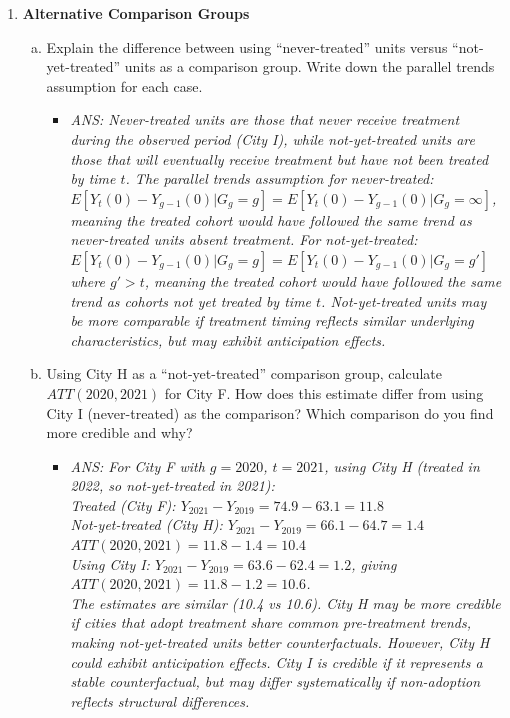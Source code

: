 \documentclass[12pt,a4paper]{article}
\newcommand{\ans}[1]{\begin{itemize}\item[$\bullet$] \textit{ANS: #1}\end{itemize}}
\begin{document}
\begin{enumerate}
\item \textbf{Alternative Comparison Groups}
\begin{enumerate}[(a)]
\item Explain the difference between using ``never-treated'' units versus ``not-yet-treated'' units as a comparison group. Write down the parallel trends assumption for each case.
\ans{Never-treated units are those that never receive treatment during the observed period (City I), while not-yet-treated units are those that will eventually receive treatment but have not been treated by time $t$. The parallel trends assumption for never-treated: $E[Y_t(0) - Y_{g-1}(0)|G_g = g] = E[Y_t(0)-Y_{g-1}(0)|G_g = \infty]$, meaning the treated cohort would have followed the same trend as never-treated units absent treatment. For not-yet-treated: $E[Y_t(0) - Y_{g-1}(0)|G_g = g] = E[Y_t(0) - Y_{g-1}(0)|G_g = g']$ where $g' > t$, meaning the treated cohort would have followed the same trend as cohorts not yet treated by time $t$. Not-yet-treated units may be more comparable if treatment timing reflects similar underlying characteristics, but may exhibit anticipation effects.}

\item Using City H as a ``not-yet-treated'' comparison group, calculate $ATT(2020, 2021)$ for City F. How does this estimate differ from using City I (never-treated) as the comparison? Which comparison do you find more credible and why?
\ans{For City F with $g = 2020$, $t = 2021$, using City H (treated in 2022, so not-yet-treated in 2021):\\
Treated (City F): $Y_{2021} - Y_{2019} = 74.9 - 63.1 = 11.8$\\
Not-yet-treated (City H): $Y_{2021} - Y_{2019} = 66.1 - 64.7 = 1.4$\\
$ATT(2020, 2021) = 11.8 - 1.4 = 10.4$\\
Using City I: $Y_{2021}-Y_{2019} = 63.6-62.4 = 1.2$, giving $ATT(2020, 2021) = 11.8 - 1.2 = 10.6$.\\
The estimates are similar (10.4 vs 10.6). City H may be more credible if cities that adopt treatment share common pre-treatment trends, making not-yet-treated units better counterfactuals. However, City H could exhibit anticipation effects. City I is credible if it represents a stable counterfactual, but may differ systematically if non-adoption reflects structural differences.}


\end{enumerate}
\end{enumerate}
\end{document}
